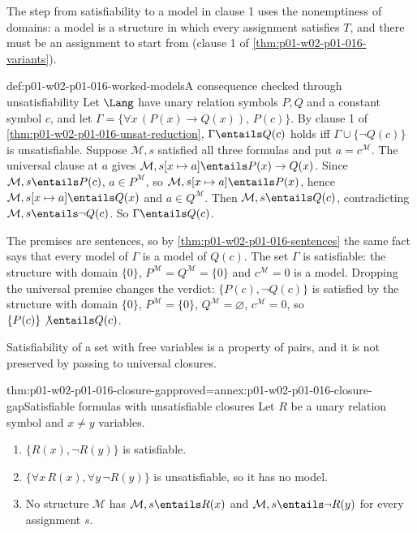 The step from satisfiability to a model in clause 1 uses the nonemptiness of
domains: a model is a structure in which every assignment satisfies \(T\), and
there must be an assignment to start from (clause 1 of
\cref{thm:p01-w02-p01-016-variants}).

\begin{hbexample}{def:p01-w02-p01-016-worked-models}{A consequence checked through unsatisfiability}
Let \(\Lang\) have unary relation symbols \(P,Q\) and a constant symbol
\(c\), and let \(\Gamma=\{\forall x\,(P(x)\to Q(x)),\,P(c)\}\). By clause 1
of \cref{thm:p01-w02-p01-016-unsat-reduction}, \(\Gamma\entails Q(c)\) holds
iff \(\Gamma\cup\{\neg Q(c)\}\) is unsatisfiable. Suppose
\(\mathcal M,s\) satisfied all three formulas and put \(a=c^{\mathcal M}\).
The universal clause at \(a\) gives
\(\mathcal M,s[x\mapsto a]\entails P(x)\to Q(x)\). Since
\(\mathcal M,s\entails P(c)\), \(a\in P^{\mathcal M}\), so
\(\mathcal M,s[x\mapsto a]\entails P(x)\), hence
\(\mathcal M,s[x\mapsto a]\entails Q(x)\) and \(a\in Q^{\mathcal M}\). Then
\(\mathcal M,s\entails Q(c)\), contradicting
\(\mathcal M,s\entails\neg Q(c)\). So \(\Gamma\entails Q(c)\).

The premises are sentences, so by \cref{thm:p01-w02-p01-016-sentences} the
same fact says that every model of \(\Gamma\) is a model of \(Q(c)\). The set
\(\Gamma\) is satisfiable: the structure with domain \(\{0\}\),
\(P^{\mathcal M}=Q^{\mathcal M}=\{0\}\) and \(c^{\mathcal M}=0\) is a model.
Dropping the universal premise changes the verdict: \(\{P(c),\neg Q(c)\}\) is
satisfied by the structure with domain \(\{0\}\), \(P^{\mathcal M}=\{0\}\),
\(Q^{\mathcal M}=\varnothing\), \(c^{\mathcal M}=0\), so
\(\{P(c)\}\not\entails Q(c)\).
\end{hbexample}

Satisfiability of a set with free variables is a property of pairs, and it is
not preserved by passing to universal closures.

\begin{hbtheorem}{thm:p01-w02-p01-016-closure-gap}{proved=annex:p01-w02-p01-016-closure-gap}{Satisfiable formulas with unsatisfiable closures}
Let \(R\) be a unary relation symbol and \(x\ne y\) variables.
\begin{enumerate}
  \item \(\{R(x),\neg R(y)\}\) is satisfiable.
  \item \(\{\forall x\,R(x),\forall y\,\neg R(y)\}\) is unsatisfiable, so it
        has no model.
  \item No structure \(\mathcal M\) has
        \(\mathcal M,s\entails R(x)\) and \(\mathcal M,s\entails\neg R(y)\)
        for every assignment \(s\).
\end{enumerate}
\end{hbtheorem}

